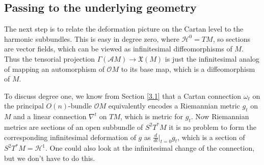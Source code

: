 \documentclass[12pt,a4paper]{amsart}
\def\frak{\mathfrak}
\def\Cal{\mathcal}
\newcommand{\om}{\omega}
\newcommand{\Ga}{\Gamma}
\numberwithin{theorem}{section}
\numberwithin{equation}{section}
\theoremstyle{definition}
\theoremstyle{remark}
\begin{document}
\subsection{Passing to the underlying geometry}\label{3.5a}
The next step is to relate the deformation picture on the Cartan level to the
harmonic subbundles. This is easy in degree zero, where $\Cal H^0=TM$, so sections
are vector fields, which can be viewed as infinitesimal diffeomorphisms of $M$. Thus
the tensorial projection $\Ga(\Cal AM)\to\frak X(M)$ is just the infinitesimal analog
of mapping an automorphism of $\Cal OM$ to its base map, which is a diffeomorphism of
$M$.

To discuss degree one, we know from Section \ref{3.1} that a Cartan connection
$\om_t$ on the principal $O(n)$-bundle $\Cal OM$ equivalently encodes a Riemannian
metric $g_t$ on $M$ and a linear connection $\nabla^t$ on $TM$, which is metric for
$g_t$. Now Riemannian metrics are sections of an open subbundle of $S^2T^*M$ it is no
problem to form the corresponding infinitesimal deformation of $g$ as
$\frac{d}{dt}|_{t=0}g_t$, which is a section of $S^2T^*M=\Cal H^1$. One could also
look at the infinitesimal change of the connection, but we don't have to do this.
\end{document}
